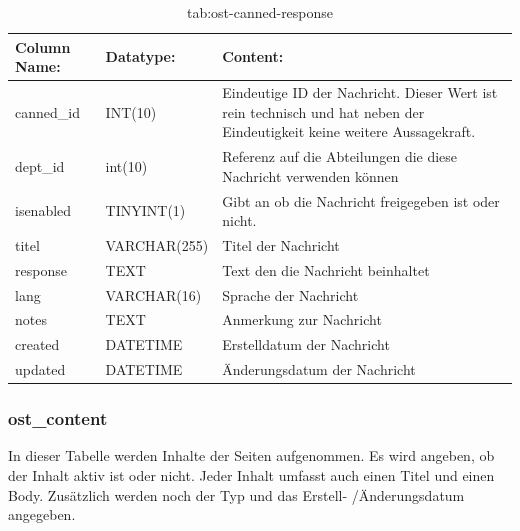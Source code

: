 \begin{table}[h]
	\begin{tabular}{|p{3.5cm}|p{4cm}|p{6.2cm}|}
		\hline
		\textbf{Column Name:} & \textbf{Datatype:} & \textbf{Content:}\\
		\hline
		canned\_id & INT(10) & Eindeutige ID der Nachricht. Dieser Wert ist rein technisch und hat  neben der Eindeutigkeit keine weitere 
		Aussagekraft.\\
		\hline
		dept\_id & int(10) & Referenz auf die Abteilungen die diese Nachricht verwenden können\\
		\hline
		isenabled & TINYINT(1) & Gibt an ob die Nachricht freigegeben ist oder nicht.\\
		\hline
		titel & VARCHAR(255) & Titel der Nachricht\\
		\hline
		response & TEXT & Text den die Nachricht beinhaltet\\
		\hline
		lang & VARCHAR(16) & Sprache der Nachricht\\
		\hline
		notes & TEXT & Anmerkung zur Nachricht\\
		\hline
		created & DATETIME & Erstelldatum der Nachricht\\
		\hline
		updated & DATETIME & Änderungsdatum der Nachricht\\
		\hline
	\end{tabular}
	\caption{tab:ost-canned-response}
\end{table}
\label{tab:ost_canned_response}

\newpage

\subsubsection{ost\_content}

In dieser Tabelle werden Inhalte der Seiten aufgenommen. Es wird angeben, ob der Inhalt aktiv ist oder nicht. Jeder Inhalt umfasst auch einen Titel und einen Body. Zusätzlich werden noch der Typ und das Erstell- /Änderungsdatum angegeben.

